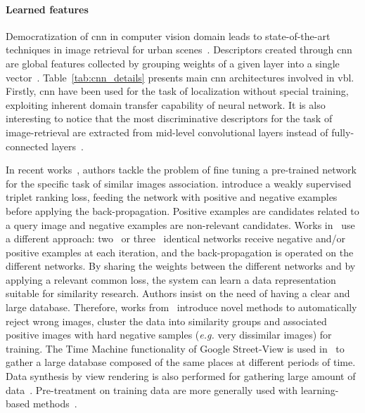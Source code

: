 		\paragraph{Learned features} 
			\label{para:global_cnn}
			Democratization of \ac{cnn} in computer vision domain leads to state-of-the-art techniques in image retrieval for urban scenes~\citep{Arandjelovic2017,Gordo2016,Kim2017a,Radenovic2016}. Descriptors created through \ac{cnn} are global features collected by grouping weights of a given layer into a single vector~\citep{Babenko2014}. Table~\ref{tab:cnn_details} presents main \ac{cnn} architectures involved in \ac{vbl}. Firstly, \ac{cnn} have been used for the task of localization without special training, exploiting inherent domain transfer capability of neural network. It is also interesting to notice that the most discriminative descriptors for the task of image-retrieval are extracted from mid-level convolutional layers instead of fully-connected layers~\citep{Babenko2014,Sunderhauf2015}.
			
			In recent works~\citep{Arandjelovic2017,Radenovic2016, Gordo2016}, authors tackle the problem of fine tuning a pre-trained network for the specific task of similar images association. \citet{Arandjelovic2017} introduce a weakly supervised triplet ranking loss, feeding the network with positive and negative examples before applying the back-propagation. Positive examples are candidates related to a query image and negative examples are non-relevant candidates. Works in~\citep{Radenovic2016, Gordo2016} use a different approach: two~\citep{Radenovic2016} or three~\citep{Gordo2016} identical networks receive negative and/or positive examples at each iteration, and the back-propagation is operated on the different networks. By sharing the weights between the different networks and by applying a relevant common loss, the system can learn a data representation suitable for similarity research.	Authors insist on the need of having a clear and large database. Therefore, works from~\citep{Radenovic2016, Gordo2016} introduce novel methods to automatically reject wrong images, cluster the data into similarity groups and associated positive images with hard negative samples (\textit{e.g.} very dissimilar images) for training. The Time Machine functionality of Google Street-View is used in~\citep{Arandjelovic2017} to gather a large database composed of the same places at different periods of time. Data synthesis by view rendering is also performed for gathering large amount of data~\citep{Jia2016,Sizikova2016}.  Pre-treatment on training data are more generally used with learning-based methods~\citep{Kim2015,Cao2013}. 
	
